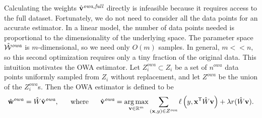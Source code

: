 \documentclass[thesis.tex]{subfiles}
\newcommand{\Zowa}{Z^{\textit{owa}}}
\newcommand{\nowa}{n^{\textit{owa}}}
\begin{document}
Calculating the weights $\hat{\mathbf{v}}^{\textit{owa,full}}$ directly is infeasible because it requires access to the full dataset.
Fortunately, we do not need to consider all the data points for an accurate estimator.
In a linear model, the number of data points needed is proportional to the dimensionality of the underlying space.
The parameter space ${\hat {{\mathcal W}}^{\textit{owa}}}$ is $m$-dimensional, so we need only $O(m)$ samples.
In general, $m <\!\!< n$, 
so this second optimization requires only a tiny fraction of the original data.
This intuition motivates the OWA estimator.
Let $\Zowa_i\subset Z_i$ be a set of $\nowa$ data points uniformly sampled from $Z_i$ without replacement,
and let $\Zowa$ be the union of the $\Zowa_i$s.
Then the OWA estimator is defined to be
\begin{equation}
\label{eq:wowa}
\wowa = \matW \vowa,
\text{~~~~~where~~~~~}
\vowa = \argmax_{\vv\in\mathbb R^m} \sum _{(\x,y)\in \Zowa} \loss\left(y,\trans\x \matW \vv \right)
+ \lambda \reg(\matW\vv)
.
\end{equation}
\end{document}
